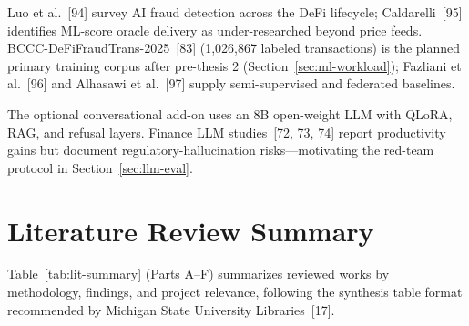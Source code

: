 \documentclass[12pt, a4paper]{report}
\begin{document}
Luo et al.~[94] survey AI fraud detection across the DeFi lifecycle; Caldarelli~[95] identifies ML-score oracle delivery as under-researched beyond price feeds. BCCC-DeFiFraudTrans-2025~[83] (1,026,867 labeled transactions) is the planned primary training corpus after pre-thesis 2 (Section~\ref{sec:ml-workload}); Fazliani et al.~[96] and Alhasawi et al.~[97] supply semi-supervised and federated baselines.

The optional conversational add-on uses an 8B open-weight LLM with QLoRA, RAG, and refusal layers. Finance LLM studies~[72, 73, 74] report productivity gains but document regulatory-hallucination risks---motivating the red-team protocol in Section~\ref{sec:llm-eval}.

\section{Literature Review Summary}

Table~\ref{tab:lit-summary} (Parts A--F) summarizes reviewed works by methodology, findings, and project relevance, following the synthesis table format recommended by Michigan State University Libraries~[17].
\end{document}
